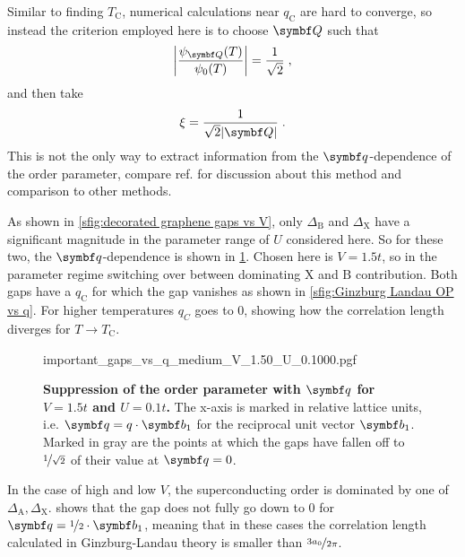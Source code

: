 \documentclass[../notes.tex]{subfiles}
\begin{document}
Similar to finding \(T_{\mathrm{C}}\), numerical calculations near \(q_{\mathrm{C}}\) are hard to converge, so instead the criterion employed here is to choose \(\vb{Q}\) such that
\begin{equation}
	\left\vert \frac{\psi_{\vb{Q}}(T)}{\psi_0 (T)} \right\vert = \frac{1}{\sqrt{2}}\;,
\end{equation}
and then take
\begin{equation}
	\xi = \frac{1}{\sqrt{2} \vert \vb{Q} \vert}\;.
\end{equation}
This is not the only way to extract information from the \(\vb{q}\)-dependence of the order parameter, compare ref. \cite{wittBypassingLatticeBCS2024} for discussion about this method and comparison to other methods.

As shown in \cref{sfig:decorated graphene gaps vs V}, only \(\Delta_{\mathrm{B}}\) and \(\Delta_{\mathrm{X}}\) have a significant magnitude in the parameter range of \(U\) considered here.
So for these two, the \(\vb{q}\)-dependence is shown in \cref{fig:decorated graphene relevant gaps vs q for medium V}.
Chosen here is \(V = 1.5t\), so in the parameter regime switching over between dominating \(\mathrm{X}\) and \(\mathrm{B}\) contribution.
Both gaps have a \(q_{\mathrm{C}}\) for which the gap vanishes as shown in \cref{sfig:Ginzburg Landau OP vs q}.
For higher temperatures \(q_C\) goes to 0, showing how the correlation length diverges for \(T \to T_{\mathrm{C}}\).
\begin{figure}[tb]
	\centering
	{important_gaps_vs_q_medium_V_1.50_U_0.1000.pgf}
	\caption[Suppression of the order parameter with \(\vb{q}\) for \(V = 1.5t\) and \(U = 0.1t\).]{
		\textbf{Suppression of the order parameter with \(\vb{q}\) for \(V = 1.5t\) and \(U = 0.1t\).} The x-axis is marked in relative lattice units, i.e. \(\vb{q} = q \cdot \vb{b}_1\) for the reciprocal unit vector \(\vb{b}_1\). Marked in gray are the points at which the gaps have fallen off to \(\nicefrac{1}{\sqrt{2}}\) of their value at \(\vb{q} = 0\).}
	\label{fig:decorated graphene relevant gaps vs q for medium V}
\end{figure}

In the case of high and low \(V\), the superconducting order is dominated by one of \(\Delta_{\mathrm{A}}, \Delta_{\mathrm{X}}\).
 shows that the gap does not fully go down to 0 for \(\vb{q} = \nicefrac{1}{2} \cdot \vb{b}_1\), meaning that in these cases the correlation length calculated in Ginzburg-Landau theory is smaller than \(\nicefrac{3 a_0}{2 \pi}\).
\end{document}
